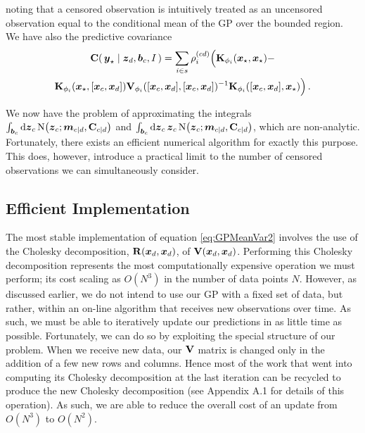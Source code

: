 \documentclass{acmtrans2m}
\begin{document}
noting that a censored observation is intuitively treated as an uncensored observation equal to the conditional mean of the GP over the bounded region. We have also the predictive covariance
\begin{multline} \label{eq:CensoredCov}
\mathbf{C}\!\left(\,\boldsymbol{y}_\star\mid\boldsymbol{z}_d,\boldsymbol{b}_c,I\,\right)=\sum_{i\in s}\rho^{(cd)}_i \Big(\mathbf{K}_{\phi_i}(\boldsymbol{x}_\star,\boldsymbol{x}_\star)-\\\mathbf{K}_{\phi_i}(\boldsymbol{x}_\star,[\boldsymbol{x}_c,\boldsymbol{x}_d])\mathbf{V}_{\phi_i}([\boldsymbol{x}_c,\boldsymbol{x}_d],[\boldsymbol{x}_c,\boldsymbol{x}_d])^{-1}\mathbf{K}_{\phi_i}([\boldsymbol{x}_c,\boldsymbol{x}_d],\boldsymbol{x}_\star)\Big)\,.
\end{multline}

We now have the problem of approximating the integrals $\int_{\boldsymbol{b}_c}\mathrm{d}\boldsymbol{z}_c\,\text{N}\!\left(\boldsymbol{z}_c;\boldsymbol{m}_{c|d},\mathbf{C}_{c|d}\right)$ and $\int_{\boldsymbol{b}_c}\mathrm{d}\boldsymbol{z}_c\,\boldsymbol{z}_c\, \text{N}\!\left(\boldsymbol{z}_c;\boldsymbol{m}_{c|d},\mathbf{C}_{c|d}\right)$, which are non-analytic. Fortunately, there exists an efficient numerical algorithm \cite{genz1992ncm} for exactly this purpose. This does, however, introduce a practical limit to the number of censored observations we can simultaneously consider.

\subsection{Efficient Implementation}\label{sec_efficient}

\noindent The most stable implementation of equation \eqref{eq:GPMeanVar2} involves the use of the Cholesky decomposition, $\mathbf{R}(\boldsymbol{x}_d,\boldsymbol{x}_d)$, of $\mathbf{V}(\boldsymbol{x}_d,\boldsymbol{x}_d)$. %
Performing this Cholesky decomposition represents the most computationally expensive operation we must perform; its cost scaling as $O(N^3)$ in the number of data points $N$. However, as discussed earlier, we do not intend to use our GP with a fixed set of data, but rather, within an on-line algorithm that receives new observations over time. As such, we must be able to iteratively update our predictions in as little time as possible. Fortunately, we can do so by exploiting the special structure of our problem. When we receive new data, our $\mathbf{V}$ matrix is changed only in the addition of a few new rows and columns. Hence most of the work that went into computing its Cholesky decomposition at the last iteration can be recycled to produce the new Cholesky decomposition (see Appendix A.1 for details of this operation). As such, we are able to reduce the overall cost of an update from $O(N^3)$ to $O(N^2)$.
\end{document}
